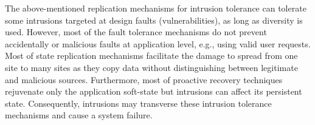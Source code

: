 The above-mentioned replication mechanisms for intrusion tolerance can tolerate some intrusions targeted at design faults (vulnerabilities), as long as diversity is used. However, most of the fault tolerance mechanisms do not prevent accidentally or malicious faults at application level, e.g., using valid user requests. Most of state replication mechanisms facilitate the damage to spread from one site to many sites as they copy data without distinguishing between legitimate and malicious sources. Furthermore, most of proactive recovery techniques rejuvenate only the application soft-state but intrusions can affect its persistent state. Consequently, intrusions may transverse these intrusion tolerance mechanisms and cause a system failure. 

